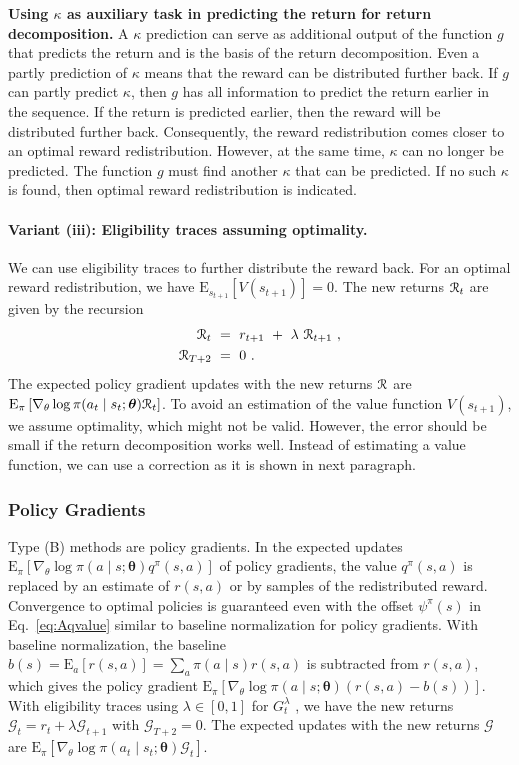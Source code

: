 \documentclass{article}
\newcommand\Bth{\bm{\theta}}
\newcommand{\cG}{\mathcal{G}} \newcommand{\cH}{\mathcal{H}}
\newcommand\EXP{\mathbf{\mathrm{E}}}
\begin{document}
\begin{appendices}
{\bf Using $\kappa$ as auxiliary task 
in predicting the return for return decomposition.}
A $\kappa$ prediction can serve as additional output of 
the function $g$ that predicts the return and
is the basis of the return decomposition. 
Even a partly prediction of $\kappa$ means that 
the reward can be distributed further back. 
If $g$ can partly predict $\kappa$, then $g$
has all information to predict the return earlier in the 
sequence. If the return is predicted 
earlier, then the reward will be distributed further back.
Consequently, the reward redistribution 
comes closer to an optimal reward redistribution.
However, at the same time, $\kappa$ can no longer be predicted.  
The function $g$ must find another $\kappa$ that can be predicted.
If no such $\kappa$ is found, then optimal reward redistribution is
indicated.



\paragraph{Variant (iii): Eligibility traces assuming optimality.}
We can use eligibility traces to further distribute the reward back.
For an optimal reward redistribution, we have
$\EXP_{s_{t+1}} [V(s_{t+1})]=0$. 
The new returns $\mathcal{R}_t$ are given by the recursion
\begin{align}
\label{th:Aeligibility}
\mathcal{R}_t \ &= \  r_{t+1} \ + \ \lambda \  \mathcal{R}_{t+1} \ , \\
\mathcal{R}_{T+2} \ &= \ 0 \ .
\end{align}
The expected policy gradient updates with the new returns $\mathcal{R}$ are
$\EXP_{\pi}\left[ \nabla_{\theta} \log \pi(a_t \mid s_t;\Bth)
  \cR_t  \right]$.
To avoid an estimation of the value function $V(s_{t+1})$, 
we assume optimality,
which might not be valid. However, the error should be small if the 
return decomposition works well.
Instead of estimating a value function, we can use a correction 
as it is shown in
next paragraph.



\subsubsection{Policy Gradients}
\label{sec:PolicyA}
Type (B) methods are policy gradients.
 In the expected updates  
$\EXP_{\pi}\left[ \nabla_{\theta} \log \pi(a \mid s;\Bth)  
q^\pi(s,a) \right]$ of policy gradients, the value $q^\pi(s,a)$ 
is replaced by an estimate of $r(s,a)$ or by
samples of the redistributed reward. 
Convergence to optimal policies is guaranteed even with the
offset $\psi^{\pi}(s)$ in Eq.~\eqref{eq:Aqvalue} 
similar to baseline normalization for policy gradients.
With baseline normalization,
the baseline $b(s)=\EXP_{a}[r(s,a)]=\sum_a \pi(a\mid s) r(s,a)$ 
is subtracted from $r(s,a)$, which gives the policy gradient  
$\EXP_{\pi}\left[ \nabla_{\theta} \log \pi(a \mid s;\Bth)  (r(s,a) - b(s))
\right]$. 
With eligibility traces using $\lambda \in
[0,1]$ for $G_t^{\lambda}$ \cite{Sutton:18book}, we have 
the new returns $\cG_t =  r_t + \lambda \cG_{t+1}$ with $\cG_{T+2} = 0$.
The expected updates with the new returns $\cG$ are
$\EXP_{\pi}\left[ \nabla_{\theta} \log \pi(a_t \mid s_t;\Bth)
\cG_t  \right]$.



\end{appendices}
\end{document}
